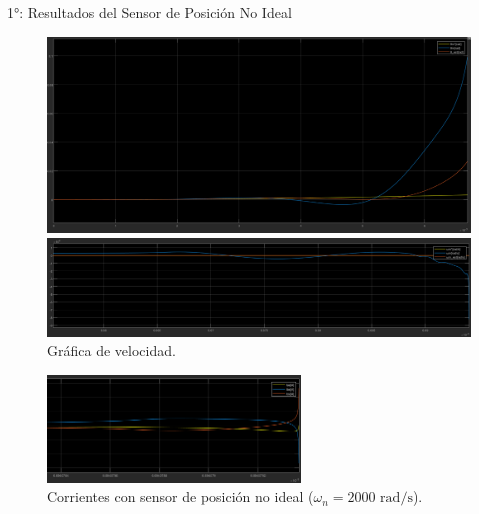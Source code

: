 \documentclass[12pt]{beamer}
\begin{document}
\begin{frame}{1°: Resultados del Sensor de Posición No Ideal}
    \begin{figure}
        \centering
        \begin{minipage}{0.48\textwidth}
            \includegraphics[width=\textwidth]{Imagenes/1_posNI_2000_p.png}
            \caption{Gráfica de posición.}
        \end{minipage}
        \hfill
        \begin{minipage}{0.48\textwidth}
            \includegraphics[width=\textwidth]{Imagenes/2_posNI_2000_w.png}
            \caption{Gráfica de velocidad.}
        \end{minipage}
    \end{figure}

    \begin{figure}
        \centering
        \includegraphics[width=0.6\textwidth]{Imagenes/3_posNI_2000_c.png}
        \caption{Corrientes con sensor de posición no ideal (\(\omega_n = 2000 \text{ rad/s}\)).}
    \end{figure}
\end{frame}
\end{document}
